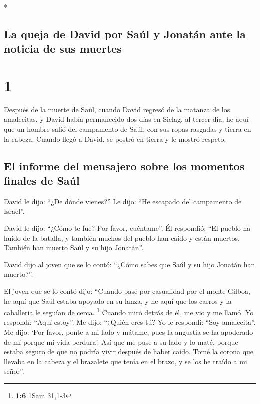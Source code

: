 \begin{paracol}{2} \switchcolumn[0]*

\hypertarget{la-queja-de-david-por-sauxfal-y-jonatuxe1n-ante-la-noticia-de-sus-muertes}{%
\subsection{La queja de David por Saúl y Jonatán ante la noticia de sus
muertes}\label{la-queja-de-david-por-sauxfal-y-jonatuxe1n-ante-la-noticia-de-sus-muertes}}

\hypertarget{section}{%
\section{1}\label{section}}

 Después de la muerte de Saúl, cuando David regresó de la
matanza de los amalecitas, y David había permanecido dos días en Siclag,
 al tercer día, he aquí que un hombre salió del campamento
de Saúl, con sus ropas rasgadas y tierra en la cabeza. Cuando llegó a
David, se postró en tierra y le mostró respeto.

\hypertarget{el-informe-del-mensajero-sobre-los-momentos-finales-de-sauxfal}{%
\subsection{El informe del mensajero sobre los momentos finales de
Saúl}\label{el-informe-del-mensajero-sobre-los-momentos-finales-de-sauxfal}}

 David le dijo: ``¿De dónde vienes?'' Le dijo: ``He
escapado del campamento de Israel''.

 David le dijo: ``¿Cómo te fue? Por favor, cuéntame''. Él
respondió: ``El pueblo ha huido de la batalla, y también muchos del
pueblo han caído y están muertos. También han muerto Saúl y su hijo
Jonatán''.

 David dijo al joven que se lo contó: ``¿Cómo sabes que
Saúl y su hijo Jonatán han muerto?''.

 El joven que se lo contó dijo: ``Cuando pasé por
casualidad por el monte Gilboa, he aquí que Saúl estaba apoyado en su
lanza, y he aquí que los carros y la caballería le seguían de cerca.
\footnote{\textbf{1:6} 1Sam 31,1-3}  Cuando miró detrás de
él, me vio y me llamó. Yo respondí: ``Aquí estoy''.  Me
dijo: ``¿Quién eres tú? Yo le respondí: ``Soy amalecita''.
 Me dijo: `Por favor, ponte a mi lado y mátame, pues la
angustia se ha apoderado de mí porque mi vida perdura'. 
Así que me puse a su lado y lo maté, porque estaba seguro de que no
podría vivir después de haber caído. Tomé la corona que llevaba en la
cabeza y el brazalete que tenía en el brazo, y se los he traído a mi
señor''.


\end{paracol}
